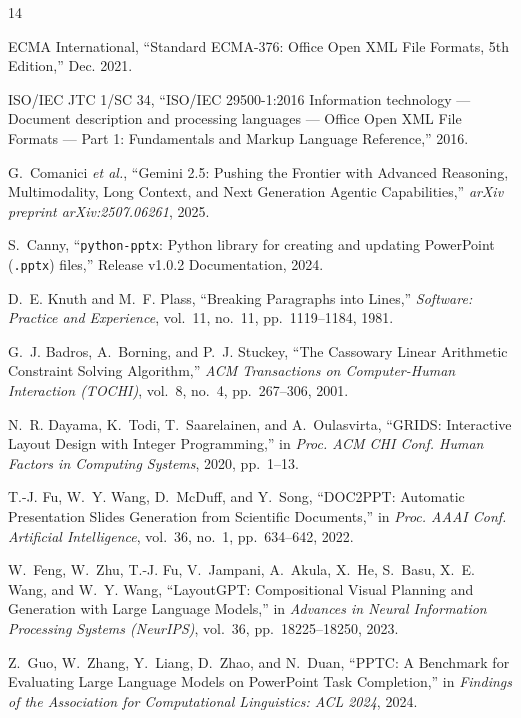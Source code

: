 \documentclass[10pt,journal,compsoc]{IEEEtran}
\begin{document}
\begin{thebibliography}{14}

ECMA International, ``Standard ECMA-376: Office Open XML File Formats, 5th Edition,'' Dec. 2021.

ISO/IEC JTC 1/SC 34, ``ISO/IEC 29500-1:2016 Information technology --- Document description and processing languages --- Office Open XML File Formats --- Part 1: Fundamentals and Markup Language Reference,'' 2016.

G.~Comanici \emph{et al.}, ``Gemini 2.5: Pushing the Frontier with Advanced Reasoning, Multimodality, Long Context, and Next Generation Agentic Capabilities,'' \emph{arXiv preprint arXiv:2507.06261}, 2025.

S.~Canny, ``\texttt{python-pptx}: Python library for creating and updating PowerPoint (\texttt{.pptx}) files,'' Release v1.0.2 Documentation, 2024.

D.~E. Knuth and M.~F. Plass, ``Breaking Paragraphs into Lines,'' \emph{Software: Practice and Experience}, vol.~11, no.~11, pp.~1119--1184, 1981.

G.~J. Badros, A.~Borning, and P.~J. Stuckey, ``The Cassowary Linear Arithmetic Constraint Solving Algorithm,'' \emph{ACM Transactions on Computer-Human Interaction (TOCHI)}, vol.~8, no.~4, pp.~267--306, 2001.

N.~R. Dayama, K.~Todi, T.~Saarelainen, and A.~Oulasvirta, ``GRIDS: Interactive Layout Design with Integer Programming,'' in \emph{Proc. ACM CHI Conf. Human Factors in Computing Systems}, 2020, pp.~1--13.

T.-J. Fu, W.~Y. Wang, D.~McDuff, and Y.~Song, ``DOC2PPT: Automatic Presentation Slides Generation from Scientific Documents,'' in \emph{Proc. AAAI Conf. Artificial Intelligence}, vol.~36, no.~1, pp.~634--642, 2022.

W.~Feng, W.~Zhu, T.-J. Fu, V.~Jampani, A.~Akula, X.~He, S.~Basu, X.~E. Wang, and W.~Y. Wang, ``LayoutGPT: Compositional Visual Planning and Generation with Large Language Models,'' in \emph{Advances in Neural Information Processing Systems (NeurIPS)}, vol.~36, pp.~18225--18250, 2023.

Z.~Guo, W.~Zhang, Y.~Liang, D.~Zhao, and N.~Duan, ``PPTC: A Benchmark for Evaluating Large Language Models on PowerPoint Task Completion,'' in \emph{Findings of the Association for Computational Linguistics: ACL 2024}, 2024.


\end{thebibliography}
\end{document}
